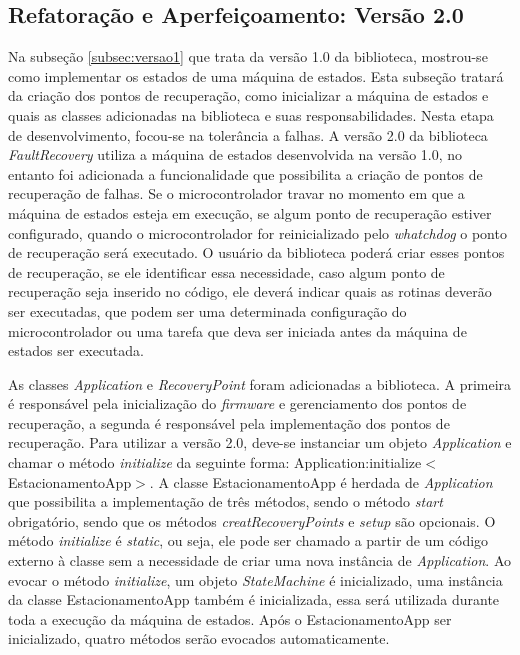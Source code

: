 \subsection{Refatoração e Aperfeiçoamento: Versão 2.0} \label{subsec:versao2}

Na subseção \ref{subsec:versao1} que trata da versão 1.0 da biblioteca, mostrou-se como implementar os estados de uma máquina de estados. Esta subseção tratará da criação dos pontos de recuperação, como inicializar a máquina de estados e quais as classes adicionadas na biblioteca e suas responsabilidades. Nesta etapa de desenvolvimento, focou-se na tolerância a falhas. A versão 2.0 da biblioteca \textit{FaultRecovery} utiliza a máquina de estados desenvolvida na versão 1.0, no entanto foi adicionada a funcionalidade que possibilita a criação de pontos de recuperação de falhas. Se o microcontrolador travar no momento em que a máquina de estados esteja em execução, se algum ponto de recuperação estiver configurado, quando o microcontrolador for reinicializado pelo \textit{whatchdog} o ponto de recuperação será executado. O usuário da biblioteca poderá criar esses pontos de recuperação, se ele identificar essa necessidade, caso algum ponto de recuperação seja inserido no código, ele deverá indicar quais as rotinas deverão ser executadas, que podem ser uma determinada configuração do microcontrolador ou uma tarefa que deva ser iniciada antes da máquina de estados ser executada. 

As classes \textit{Application} e \textit{RecoveryPoint} foram adicionadas a biblioteca. A primeira é responsável pela inicialização do \textit{firmware} e gerenciamento dos pontos de recuperação, a segunda é responsável pela implementação dos pontos de recuperação. Para utilizar a versão 2.0, deve-se instanciar um objeto \textit{Application} e chamar o método \textit{initialize} da seguinte forma: Application:initialize$<$EstacionamentoApp$>$. A classe EstacionamentoApp é herdada de \textit{Application} que possibilita a implementação de três métodos, sendo o método \textit{start} obrigatório, sendo que os métodos \textit{creatRecoveryPoints} e \textit{setup} são opcionais. O método \textit{initialize} é \textit{static}, ou seja, ele pode ser chamado a partir de um código externo à classe sem a necessidade de criar uma nova instância de \textit{Application}. Ao evocar o método \textit{initialize}, um objeto \textit{StateMachine} é inicializado, uma instância da classe EstacionamentoApp também é inicializada, essa será utilizada durante toda a execução da máquina de estados. Após o EstacionamentoApp ser inicializado, quatro métodos serão evocados automaticamente. 

